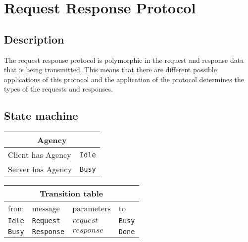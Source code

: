 \documentclass{report}
\newcommand{\hsref}[1]{}
\newcommand{\hsref}[1]
                    {\href{https://github.com/input-output-hk/ouroboros-network/blob/master/#1}
                      {\emph{Haskell source: #1}}}
\newcommand{\state}[1]{\texttt{#1}}
\newcommand{\msg}[1]{\texttt{#1}}
\newcommand{\Idle}{\state{Idle}}
\newcommand{\Busy}{\state{Busy}}
\newcommand{\Done}{\state{Done}}
\theoremstyle{definition}{
  \newtheorem{lemma}{Lemma}[section] %
  \newtheorem{definition}[lemma]{Definition}
}
\theoremstyle{theorem}{
  \newtheorem{invariant}[lemma]{Invariant}
  \newtheorem{proofobligation}[lemma]{Proof Obligation}
}
\numberwithin{equation}{lemma}
\begin{document}
\section{Request Response Protocol}
\label{request-response-protocol}
\renewcommand{\Idle}{\state{Idle}}
\renewcommand{\Busy}{\state{Busy}}
\renewcommand{\Done}{\state{Done}}
\newcommand{\Request}{\msg{Request}}
\newcommand{\Response}{\msg{Response}}

\subsection{Description}
The request response protocol is polymorphic in the request and response data that is being transmitted.
This means that there are different possible applications of this protocol and the
application of the protocol determines the types of the requests and responses.

\subsection{State machine}
\hsref{ouroboros-network/src/Ouroboros/Network/Protocol/ReqResp/Type.hs}

\begin{tabular}{|l|l|}
  \hline
  \multicolumn{2}{|c|}{Agency} \\ \hline
  Client has Agency & \Idle \\  \hline
  Server has Agency & \Busy \\ \hline
\end{tabular}
{\vskip 10pt}
{\vskip 10pt}
\begin{tabular}{|l|l|l|l|} \hline
\multicolumn{4}{|c|}{Transition table} \\ \hline
  from         & message            & parameters             & to       \\ \hline\hline
  \Idle        & \Request           & $request$              & \Busy     \\ \hline
  \Busy        & \Response          & $response$             & \Done     \\ \hline
\end{tabular}
\end{document}
